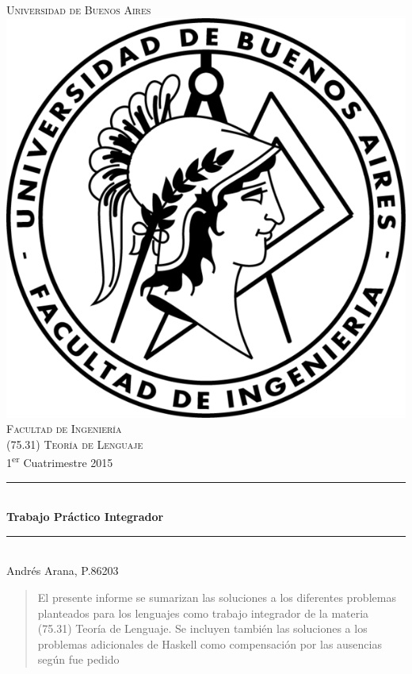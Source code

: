 \documentclass[12pt]{article}
\begin{document}
\begin{titlepage}

\newcommand{\HRule}{\rule{\linewidth}{0.5mm}}

\center

\textsc{\LARGE Universidad de Buenos Aires}\\[1.5cm]

\includegraphics{docs/images/logo-fiuba.png}\\[1cm]

\textsc{\Large Facultad de Ingeniería}\\[0.5cm]
\textsc{\large (75.31) Teoría de Lenguaje}\\[0.5cm]
{\large 1\textsuperscript{er} Cuatrimestre 2015}\\[0.5cm]

\HRule \\[0.4cm]
{ \huge \bfseries Trabajo Práctico Integrador}\\[0.4cm]
\HRule \\[1.5cm]

\large Andrés Arana, P.86203

\vfill

\end{titlepage}

\begin{abstract}

El presente informe se sumarizan las soluciones a los diferentes problemas
planteados para los lenguajes como trabajo integrador de la materia (75.31)
Teoría de Lenguaje. Se incluyen también las soluciones a los problemas
adicionales de Haskell como compensación por las ausencias según fue pedido

\end{abstract}
\end{document}
